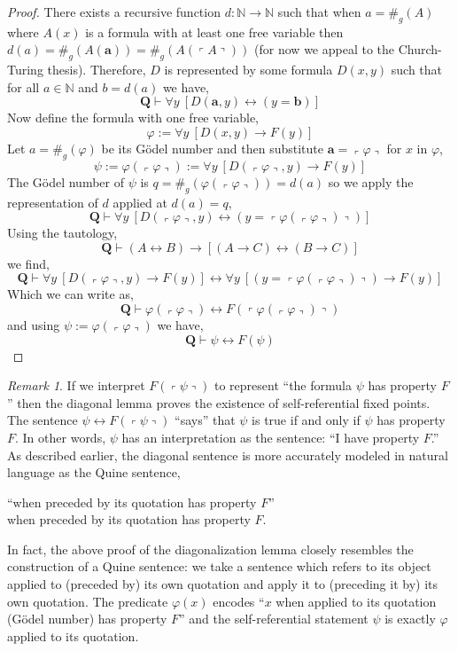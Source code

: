 \documentclass[12pt, leqno]{article}
\newcommand{\N}{\mathbb{N}}
\renewcommand{\bf}[1]{\mathbf{#1}}
\newcommand{\proves}{\vdash}
\newcommand{\uq}[1]{\forall{#1} \:}
\theoremstyle{theorem}
\theoremstyle{definition}
\theoremstyle{definition}
\theoremstyle{remark}
\theoremstyle{definition}
\theoremstyle{remark}
\newtheorem{remark}{Remark}[subsection]
\newcommand{\Gnum}[1]{\#_g\left( #1 \right)}
\newcommand{\Gterm}[1]{\left\ulcorner #1 \right\urcorner}
\begin{document}
\begin{proof}
There exists a recursive function $d : \N \to \N$ such that when $a = \Gnum{A}$ where $A(x)$ is a formula with at least one free variable then $d(a) = \Gnum{A(\bf{a})} = \Gnum{A(\Gterm{A})}$ (for now we appeal to the Church-Turing thesis). Therefore, $D$ is represented by some formula $D(x, y)$ such that for all $a \in \N$ and $b = d(a)$ we have,
\[ \bf{Q} \proves \uq{y} [ D(\bf{a}, y) \leftrightarrow (y = \bf{b}) ] \]
Now define the formula with one free variable,
\[ \varphi := \uq{y} [D(x, y) \to F(y) ] \]
Let $a = \Gnum{\varphi}$ be its G\"{o}del number and then substitute $\bf{a} = \Gterm{\varphi}$ for $x$ in $\varphi$,
\[ \psi := \varphi(\Gterm{\varphi}) := \uq{y} [D(\Gterm{\varphi}, y) \to F(y)] \]
The G\"{o}del number of $\psi$ is $q = \Gnum{\varphi(\Gterm{\varphi})} = d(a)$ so we apply the representation of $d$ applied at $d(a) = q$,
\[ \bf{Q} \proves \uq{y} [D(\Gterm{\varphi}, y) \leftrightarrow (y = \Gterm{\varphi(\Gterm{\varphi})})] \] 
Using the tautology,
\[ \bf{Q} \proves (A \leftrightarrow B) \to [(A \to C) \leftrightarrow (B \to C)] \]
we find,
\[ \bf{Q} \proves \uq{y} [D(\Gterm{\varphi}, y) \to F(y)] \leftrightarrow \uq{y} [(y = \Gterm{\varphi(\Gterm{\varphi})}) \to F(y)] \]
Which we can write as,
\[ \bf{Q} \proves \varphi(\Gterm{\varphi}) \leftrightarrow F(\Gterm{\varphi(\Gterm{\varphi})}) \]
and using $\psi := \varphi(\Gterm{\varphi})$ we have,
\[ \bf{Q} \proves \psi \leftrightarrow F(\psi) \] 
\end{proof}

\begin{remark}
If we interpret $F(\Gterm{\psi})$ to represent ``the formula $\psi$ has property $F$'' then the diagonal lemma proves the existence of self-referential fixed points. The sentence $\psi \leftrightarrow F(\Gterm{\psi})$ ``says'' that $\psi$ is true if and only if $\psi$ has property $F$. In other words, $\psi$ has an interpretation as the sentence: ``I have property $F$.'' 
As described earlier, the diagonal sentence is more accurately modeled in natural language as the Quine sentence,
\begin{center}
``when preceded by its quotation has property $F$''
\\ when preceded by its quotation has property $F$.
\end{center}
In fact, the above proof of the diagonalization lemma closely  resembles the construction of a Quine sentence: we take a sentence which refers to its object applied to (preceded by) its own quotation and apply it to (preceding it by) its own quotation. The predicate $\varphi(x)$ encodes ``$x$ when applied to its quotation (G\"{o}del number) has property $F$'' and the self-referential statement $\psi$ is exactly $\varphi$ applied to its quotation. 
\end{remark}
\end{document}
